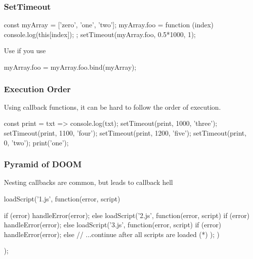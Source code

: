 \begin{frame}[fragile] \frametitle{SetTimeout}
\begin{CodeBox}{}
const myArray = ['zero', 'one', 'two'];
myArray.foo = function (index) {
  console.log(this[index]);
};
setTimeout(myArray.foo, 0.5*1000, 1);
\end{CodeBox}
\vspace{4mm}
Use  if you use 
\vspace{4mm}
\begin{CodeBox}{}
myArray.foo = myArray.foo.bind(myArray);
\end{CodeBox}

\end{frame}

\begin{frame}[fragile] \frametitle{Execution Order}
Using callback functions, it can be hard to follow the order of execution.
\vspace{5mm}
\begin{CodeBox}{}
const print = txt => console.log(txt);
setTimeout(print, 1000, 'three');
setTimeout(print, 1100, 'four');
setTimeout(print, 1200, 'five');
setTimeout(print, 0, 'two');
print('one');
\end{CodeBox}
\end{frame}

\begin{frame}[fragile] \frametitle{Pyramid of DOOM}
Nesting callbacks are common, but leads to callback hell
\vspace{5mm}
\begin{CodeBox}{}
loadScript('1.js', function(error, script) {

  if (error) {
    handleError(error);
  } else {
    loadScript('2.js', function(error, script) {
      if (error) {
        handleError(error);
      } else {
        loadScript('3.js', function(error, script) {
          if (error) {
            handleError(error);
          } else {
            // ...continue after all scripts are loaded (*)
          }
        });
      }
    })
  }
});\end{CodeBox}
\end{frame}

